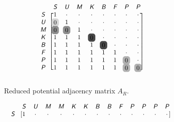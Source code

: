 \begin{figure}
\centering
\begin{subfigure}[b]{\columnwidth}
\centering
\begin{align*}
\scalemath{0.9}{
\begin{blockarray}{ccccccccc}
& \xcolor{S} & \xcolor{U} & \xcolor{M} & \xcolor{K} & \xcolor{B} & \xcolor{F} & \xcolor{P} & \xcolor{P} \\
\begin{block}{c[cccccccc]}
\xcolor{S} & 1 & \cdot & \cdot & \cdot & \cdot & \cdot & \cdot & \cdot \\
\xcolor{U} & \hlight{0}{20} & 1 & \cdot & \cdot & \cdot & \cdot & \cdot & \cdot \\
\xcolor{M} & \hlight{0}{55} & \hlight{0}{55} & 1 & \cdot & \cdot & \cdot & \cdot & \cdot  \\
\xcolor{K} & 1 & 1 & 1 & \hlight{0}{90} & \cdot & \cdot & \cdot & \cdot  \\
\xcolor{B} & 1 & 1 & 1 & 1 & \hlight{0}{90} & \cdot & \cdot & \cdot  \\
\xcolor{F} & 1 & 1 & 1 & 1 & 1 & 1 & \cdot & \cdot  \\
\xcolor{P} & 1 & 1 & 1 & 1 & 1 & 1 & \hlight{0}{37.5} & \cdot \\
\xcolor{P} & 1 & 1 & 1 & 1 & 1 & 1 & \hlight{0}{37.5} & \hlight{0}{37.5} \\
\end{block}
\end{blockarray}
}
\end{align*}
\caption{Reduced potential adjacency matrix $A_R$.\label{fig:ch2:suspension2_1}}
\end{subfigure}
% 
\begin{subfigure}[b]{\columnwidth}
\vspace{0.3in}
\centering
\begin{align*}
\scalemath{0.9}{
\begin{blockarray}{cccccccccccccc}
& \xcolor{S} & \xcolor{U} & \xcolor{M} & \xcolor{M} & \xcolor{K} & \xcolor{K} & \xcolor{B} & \xcolor{B} & \xcolor{F} & \xcolor{P} & \xcolor{P} & \xcolor{P} & \xcolor{P} \\
\begin{block}{c[ccccccccccccc]}
\xcolor{S} & \tikzmark{top}{1} & \cdot & \cdot & \cdot & \cdot & \cdot & \cdot & \cdot & \cdot & \cdot & \cdot & \cdot & \cdot \\

\end{block}
\end{blockarray}}
\end{align*}
\end{subfigure}
\end{figure}
